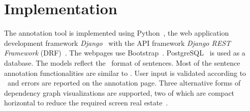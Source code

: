 \section{Implementation}
\label{sec:implementation}

The annotation tool is implemented using  Python~\cite{python}, the web application development framework \textit{Django}~\cite{django} with the API framework \textit{Django REST Framework} (DRF)~\cite{drf}. The webpages use Bootstrap~\cite{bootstrap}.
PostgreSQL~\cite{psql} is used as a database.
The models reflect the \ud\ format of sentences.
Most of the sentence annotation functionalities are similar to \boatvone.
User input is validated according to  \ud\ and errors are reported on the annotation page. 
Three alternative forms of dependency graph visualizations are supported, two of which are compact horizontal to reduce the required screen real estate~\cite{spacy,spyssalo,spyssalo}.

